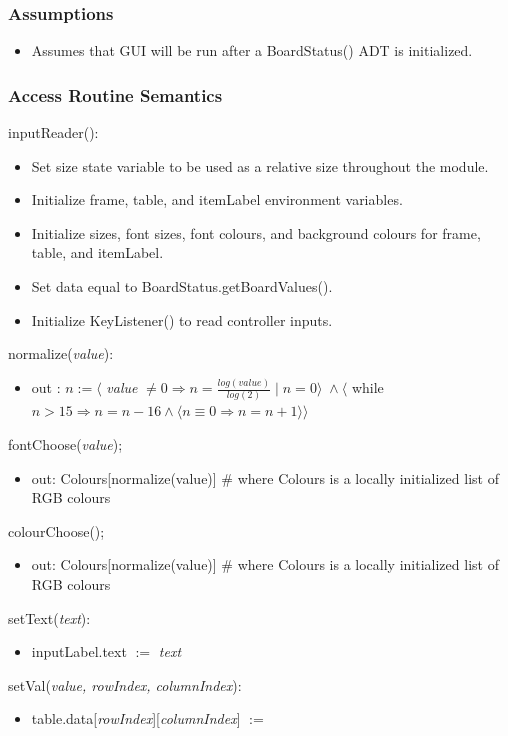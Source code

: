 \documentclass{article}
\begin{document}
\subsubsection*{Assumptions}
\begin{itemize}
    \item Assumes that GUI will be run after a BoardStatus() ADT is initialized.
\end{itemize}
\subsubsection*{Access Routine Semantics}

inputReader():
\begin{itemize}
    \item Set size state variable to be used as a relative size throughout the module.
    \item Initialize frame, table, and itemLabel environment variables.
    \item Initialize sizes, font sizes, font colours, and background colours for frame, table, and itemLabel.
    \item Set data equal to BoardStatus.getBoardValues().
    \item Initialize KeyListener() to read controller inputs.
\end{itemize}
normalize(\textit{value}):
\begin{itemize}
    \item out : $n := \langle$ \textit{value} $ \neq 0 \Rightarrow  n = \frac{log(\textit{value})}{log(\textit{2})}\; |\; n = 0 \rangle \; \land \langle$ while $n > 15 \Rightarrow n = n - 16 \land \langle n \equiv 0 \Rightarrow n = n + 1 \rangle \rangle$
\end{itemize}
fontChoose(\textit{value});
\begin{itemize}
    \item out: Colours[normalize(value)]
 \# where Colours is a locally initialized list of RGB colours
 \end{itemize}
colourChoose();
\begin{itemize}
\item out: Colours[normalize(value)]
 \# where Colours is a locally initialized list of RGB colours
 \end{itemize}
setText(\textit{text}):
 \begin{itemize}
     \item inputLabel.text $:=$ \textit{text}
 \end{itemize}
setVal(\textit{value, rowIndex, columnIndex}):
\begin{itemize}
    \item table.data[\textit{rowIndex}][\textit{columnIndex}] $:=$ 
\end{itemize}
\end{document}
